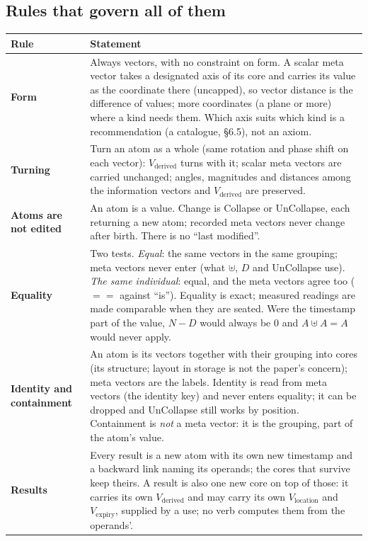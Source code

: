 \documentclass[10.5pt]{article}
\begin{document}
\subsection*{Rules that govern all of them}
{\small\setlength{\tabcolsep}{4pt}\begin{longtable}{L{3.0cm}L{13.6cm}}
\toprule
\textbf{Rule} & \textbf{Statement} \\
\midrule
\endhead
\textbf{Form} & Always vectors, with no constraint on form. A scalar meta vector takes a designated axis of its core and carries its value as the coordinate there (uncapped), so vector distance is the difference of values; more coordinates (a plane or more) where a kind needs them. Which axis suits which kind is a recommendation (a catalogue, §6.5), not an axiom. \\
\textbf{Turning} & Turn an atom as a whole (same rotation and phase shift on each vector): $V_{\text{derived}}$ turns with it; scalar meta vectors are carried unchanged; angles, magnitudes and distances among the information vectors and $V_{\text{derived}}$ are preserved. \\
\textbf{Atoms are not edited} & An atom is a value. Change is Collapse or UnCollapse, each returning a new atom; recorded meta vectors never change after birth. There is no “last modified”. \\
\textbf{Equality} & Two tests. \emph{Equal}: the same vectors in the same grouping; meta vectors never enter (what $\uplus$, $D$ and UnCollapse use). \emph{The same individual}: equal, and the meta vectors agree too ($==$ against “is”). Equality is exact; measured readings are made comparable when they are seated. Were the timestamp part of the value, $N-D$ would always be $0$ and $A\uplus A=A$ would never apply. \\
\textbf{Identity and containment} & An atom is its vectors together with their grouping into cores (its structure; layout in storage is not the paper's concern); meta vectors are the labels. Identity is read from meta vectors (the identity key) and never enters equality; it can be dropped and UnCollapse still works by position. Containment is \emph{not} a meta vector: it is the grouping, part of the atom's value. \\
\textbf{Results} & Every result is a new atom with its own new timestamp and a backward link naming its operands; the cores that survive keep theirs. A result is also one new core on top of those: it carries its own $V_{\text{derived}}$ and may carry its own $V_{\text{location}}$ and $V_{\text{expiry}}$, supplied by a use; no verb computes them from the operands'. \\

\end{longtable}}
\end{document}
